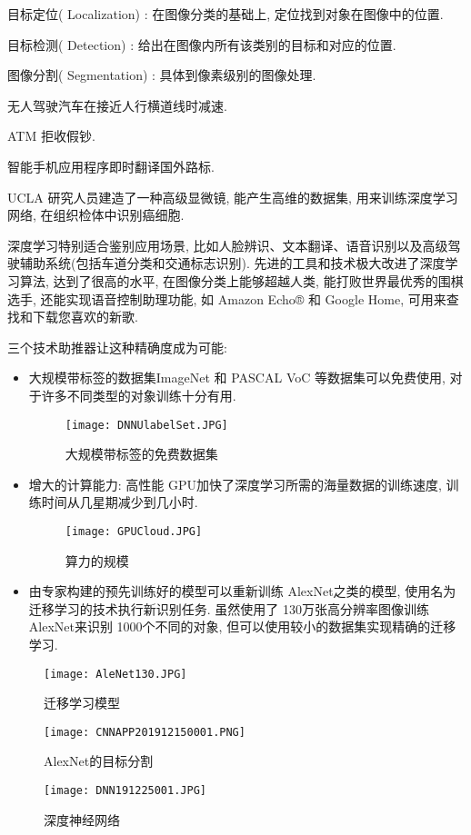  目标定位( Localization) :  在图像分类的基础上,  定位找到对象在图像中的位置.

 目标检测( Detection) : 给出在图像内所有该类别的目标和对应的位置.

 图像分割( Segmentation) : 具体到像素级别的图像处理.

 无人驾驶汽车在接近人行横道线时减速.

 ATM 拒收假钞.

 智能手机应用程序即时翻译国外路标.

 UCLA 研究人员建造了一种高级显微镜, 能产生高维的数据集, 用来训练深度学习网络, 在组织检体中识别癌细胞.

深度学习特别适合鉴别应用场景, 比如人脸辨识、文本翻译、语音识别以及高级驾驶辅助系统(包括车道分类和交通标志识别).
先进的工具和技术极大改进了深度学习算法, 达到了很高的水平, 在图像分类上能够超越人类, 能打败世界最优秀的围棋选手, 还能实现语音控制助理功能, 如 Amazon Echo® 和 Google Home, 可用来查找和下载您喜欢的新歌.

三个技术助推器让这种精确度成为可能:
\begin{itemize}
\item 大规模带标签的数据集ImageNet 和 PASCAL VoC 等数据集可以免费使用, 对于许多不同类型的对象训练十分有用.
\begin{figure}[H]
\centering
\texttt{[image: DNNUlabelSet.JPG]}
\caption{大规模带标签的免费数据集}
\label{DNNUlabelSet201912250001}
\vspace{-0.4cm}
\end{figure}
\item 增大的计算能力: 高性能 GPU加快了深度学习所需的海量数据的训练速度, 训练时间从几星期减少到几小时.
\begin{figure}[H]
\centering
\texttt{[image: GPUCloud.JPG]}
\caption{算力的规模}
\label{GPUCloud201912250002}
\end{figure}
\item 由专家构建的预先训练好的模型可以重新训练 AlexNet之类的模型, 使用名为迁移学习的技术执行新识别任务.
虽然使用了 130万张高分辨率图像训练 AlexNet来识别 1000个不同的对象, 但可以使用较小的数据集实现精确的迁移学习.
\end{itemize}
\begin{figure}[H]
\centering
\texttt{[image: AleNet130.JPG]}
\caption{迁移学习模型}
\label{AleNet130201912250003}
\end{figure}
\begin{figure}[H]
\centering
\texttt{[image: CNNAPP201912150001.PNG]}
\caption{ AlexNet的目标分割}
\label{CNNAPP201912150001}
\end{figure}
\begin{figure}[H]
\centering
\texttt{[image: DNN191225001.JPG]}
\caption{深度神经网络}
\label{DNN191225001}
\end{figure}

